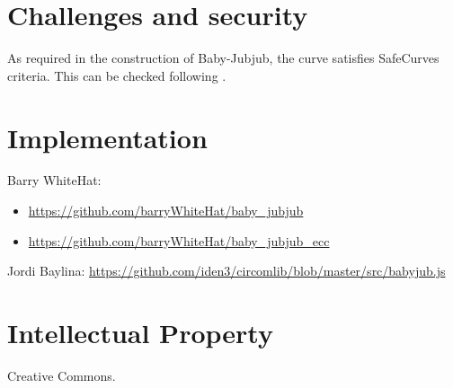 \documentclass{article}
\begin{document}
\begin{spacing}{1.2}
\section{Challenges and security}	
	As required in the construction of Baby-Jubjub, the curve satisfies SafeCurves criteria. This can be checked following \cite{github-barry}.
	
\section{Implementation}		%
	Barry WhiteHat:	
	\begin{itemize}
		\item %
		\url{https://github.com/barryWhiteHat/baby_jubjub}
		\item \url{https://github.com/barryWhiteHat/baby_jubjub_ecc} 
	\end{itemize}
	Jordi Baylina: \url{https://github.com/iden3/circomlib/blob/master/src/babyjub.js}
	
\section {Intellectual Property}	%
	Creative Commons.

	
	
\end{spacing}	
\end{document}

